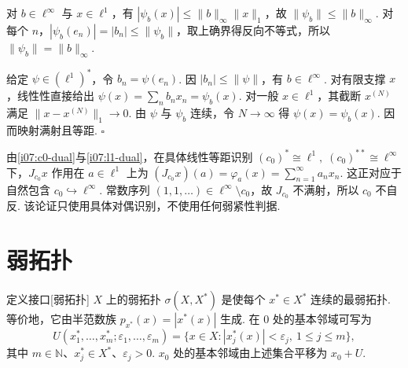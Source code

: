 \begin{FAProof}
对 \(\displaystyle b\in\ell^\infty\) 与 \(\displaystyle x\in\ell^1\)，有 \(\displaystyle |\psi_b(x)|\leqslant\|b\|_\infty\|x\|_1\)，故 \(\displaystyle \|\psi_b\|\leqslant\|b\|_\infty\). 对每个 \(\displaystyle n\)，\(\displaystyle |\psi_b(e_n)|=|b_n|\leqslant\|\psi_b\|\)，取上确界得反向不等式，所以 \(\displaystyle \|\psi_b\|=\|b\|_\infty\).

给定 \(\displaystyle \psi\in(\ell^1)^*\)，令 \(\displaystyle b_n=\psi(e_n)\). 因 \(\displaystyle |b_n|\leqslant\|\psi\|\)，有 \(\displaystyle b\in\ell^\infty\). 对有限支撑 \(\displaystyle x\)，线性性直接给出 \(\displaystyle \psi(x)=\sum_nb_nx_n=\psi_b(x)\). 对一般 \(\displaystyle x\in\ell^1\)，其截断 \(\displaystyle x^{(N)}\) 满足 \(\displaystyle \|x-x^{(N)}\|_1\to0\). 由 \(\displaystyle \psi\) 与 \(\displaystyle \psi_b\) 连续，令 \(\displaystyle N\to\infty\) 得 \(\displaystyle \psi(x)=\psi_b(x)\). 因而映射满射且等距.
\hfill\(\square\)
\end{FAProof}

\begin{FACounterexample}\label{i07:c0-nonreflexive}
由\autoref{i07:c0-dual}与\autoref{i07:l1-dual}，在具体线性等距识别 \(\displaystyle (c_0)^*\cong\ell^1, \; (c_0)^{**}\cong\ell^\infty\)
下，\(\displaystyle J_{c_0}x\) 作用在 \(\displaystyle a\in\ell^1\) 上为 \(\displaystyle (J_{c_0}x)(a)=\varphi_a(x)=\sum_{n=1}^{\infty}a_nx_n\).
这正对应于自然包含 \(\displaystyle c_0\hookrightarrow\ell^\infty\). 常数序列 \(\displaystyle (1,1,\dots)\in\ell^\infty\setminus c_0\)，故 \(\displaystyle J_{c_0}\) 不满射，所以 \(\displaystyle c_0\) 不自反. 该论证只使用具体对偶识别，不使用任何弱紧性判据.
\end{FACounterexample}

\section{弱拓扑}\label{sec:i07-weak-topology}

\begin{FALightBox}{定义接口}[弱拓扑]
\(\displaystyle X\) 上的弱拓扑 \(\displaystyle \sigma(X,X^*)\) 是使每个 \(\displaystyle x^*\in X^*\) 连续的最弱拓扑. 等价地，它由半范数族 \(\displaystyle p_{x^*}(x)=|x^*(x)|\) 生成. 在 \(\displaystyle0\) 处的基本邻域可写为
\[
U(x_1^*,\dots,x_m^*;\varepsilon_1,\dots,\varepsilon_m)
=\{x\in X:|x_j^*(x)|<\varepsilon_j,\ 1\leqslant j\leqslant m\},
\]
其中 \(\displaystyle m\in\mathbb N\)、\(\displaystyle x_j^*\in X^*\)、\(\displaystyle \varepsilon_j>0\). \(\displaystyle x_0\) 处的基本邻域由上述集合平移为 \(\displaystyle x_0+U\).
\end{FALightBox}

